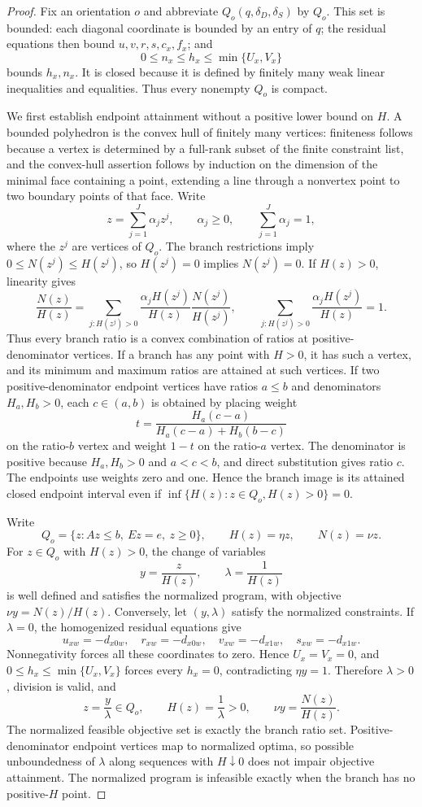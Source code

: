\documentclass{article}
\begin{document}
\begin{proof}
Fix an orientation \(o\) and abbreviate \(Q_o(q,\delta_D,\delta_S)\) by \(Q_o\). This set is bounded: each diagonal coordinate is bounded by an entry of \(q\); the residual equations then bound \(u,v,r,s,c_x,f_x\); and
\[
 0\leq n_x\leq h_x\leq\min\{U_x,V_x\}
\]
bounds \(h_x,n_x\). It is closed because it is defined by finitely many weak linear inequalities and equalities. Thus every nonempty \(Q_o\) is compact.

We first establish endpoint attainment without a positive lower bound on \(H\). A bounded polyhedron is the convex hull of finitely many vertices: finiteness follows because a vertex is determined by a full-rank subset of the finite constraint list, and the convex-hull assertion follows by induction on the dimension of the minimal face containing a point, extending a line through a nonvertex point to two boundary points of that face. Write
\[
 z=\sum_{j=1}^J\alpha_jz^j,
 \qquad \alpha_j\geq0,
 \qquad \sum_{j=1}^J\alpha_j=1,
\]
where the \(z^j\) are vertices of \(Q_o\). The branch restrictions imply \(0\leq N(z^j)\leq H(z^j)\), so \(H(z^j)=0\) implies \(N(z^j)=0\). If \(H(z)>0\), linearity gives
\[
 \frac{N(z)}{H(z)}
 =\sum_{j:H(z^j)>0}
 \frac{\alpha_jH(z^j)}{H(z)}
 \frac{N(z^j)}{H(z^j)},
 \qquad
 \sum_{j:H(z^j)>0}\frac{\alpha_jH(z^j)}{H(z)}=1.
\]
Thus every branch ratio is a convex combination of ratios at positive-denominator vertices. If a branch has any point with \(H>0\), it has such a vertex, and its minimum and maximum ratios are attained at such vertices. If two positive-denominator endpoint vertices have ratios \(a\leq b\) and denominators \(H_a,H_b>0\), each \(c\in(a,b)\) is obtained by placing weight
\[
 t=\frac{H_a(c-a)}{H_a(c-a)+H_b(b-c)}
\]
on the ratio-\(b\) vertex and weight \(1-t\) on the ratio-\(a\) vertex. The denominator is positive because \(H_a,H_b>0\) and \(a<c<b\), and direct substitution gives ratio \(c\). The endpoints use weights zero and one. Hence the branch image is its attained closed endpoint interval even if \(\inf\{H(z):z\in Q_o,H(z)>0\}=0\).

Write
\[
 Q_o=\{z:Az\leq b,\ Ez=e,\ z\geq0\},
 \qquad H(z)=\eta z,
 \qquad N(z)=\nu z.
\]
For \(z\in Q_o\) with \(H(z)>0\), the change of variables
\[
 y=\frac{z}{H(z)},
 \qquad \lambda=\frac{1}{H(z)}
\]
is well defined and satisfies the normalized program, with objective \(\nu y=N(z)/H(z)\). Conversely, let \((y,\lambda)\) satisfy the normalized constraints. If \(\lambda=0\), the homogenized residual equations give
\[
 u_{xw}=-d_{x0w},\quad r_{xw}=-d_{x0w},\quad
 v_{xw}=-d_{x1w},\quad s_{xw}=-d_{x1w}.
\]
Nonnegativity forces all these coordinates to zero. Hence \(U_x=V_x=0\), and \(0\leq h_x\leq\min\{U_x,V_x\}\) forces every \(h_x=0\), contradicting \(\eta y=1\). Therefore \(\lambda>0\), division is valid, and
\[
 z=\frac{y}{\lambda}\in Q_o,
 \qquad H(z)=\frac1\lambda>0,
 \qquad \nu y=\frac{N(z)}{H(z)}.
\]
The normalized feasible objective set is exactly the branch ratio set. Positive-denominator endpoint vertices map to normalized optima, so possible unboundedness of \(\lambda\) along sequences with \(H\downarrow0\) does not impair objective attainment. The normalized program is infeasible exactly when the branch has no positive-\(H\) point.


\end{proof}
\end{document}
